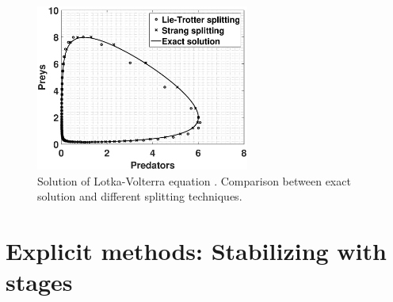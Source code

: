 \documentclass[a4paper,11pt ]{report}
\theoremstyle{definition}
\begin{document}
\begin{figure}
\centering
\includegraphics[width=7cm]{img/lotka_volterra.eps}
\caption{Solution of Lotka-Volterra equation \cite{Lotka}. Comparison between exact solution and different splitting techniques. }
\end{figure}
\section{Explicit methods: Stabilizing with stages}
\end{document}
